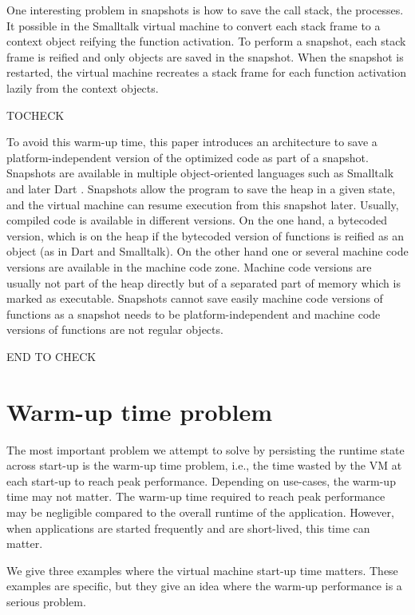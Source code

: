 \documentclass[a4paper,12pt,twoside]{../includes/ThesisStyle}
\begin{document}
One interesting problem in snapshots is how to save the call stack, \ie the processes. It possible in the Smalltalk virtual machine to convert each stack frame to a context object reifying the function activation. To perform a snapshot, each stack frame is reified and only objects are saved in the snapshot. When the snapshot is restarted, the virtual machine recreates a stack frame for each function activation lazily from the context objects. 

TOCHECK


To avoid this warm-up time, this paper introduces an architecture to save a platform-independent version of the optimized code as part of a snapshot. Snapshots are available in multiple object-oriented languages such as Smalltalk \cite{Gold83a} and later Dart \cite{Anna13a}. Snapshots allow the program to save the heap in a given state, and the virtual machine can resume execution from this snapshot later. Usually, compiled code is available in different versions. On the one hand, a bytecoded version, which is on the heap if the bytecoded version of functions is reified as an object (as in Dart and Smalltalk).  On the other hand one or several machine code versions are available in the machine code zone. Machine code versions are usually not part of the heap directly but of a separated part of memory which is marked as executable. Snapshots cannot save easily machine code versions of functions as a snapshot needs to be platform-independent and machine code versions of functions are not regular objects.

END TO CHECK

\section{Warm-up time problem}
\label{sec:warmup}

The most important problem we attempt to solve by persisting the runtime state across start-up is the warm-up time problem, i.e., the time wasted by the VM at each start-up to reach peak performance. Depending on use-cases, the warm-up time may not matter. The warm-up time required to reach peak performance may be negligible compared to the overall runtime of the application. However, when applications are started frequently and are short-lived, this time can matter.

We give three examples where the virtual machine start-up time matters. These examples are specific, but they give an idea where the warm-up performance is a serious problem.
\end{document}
